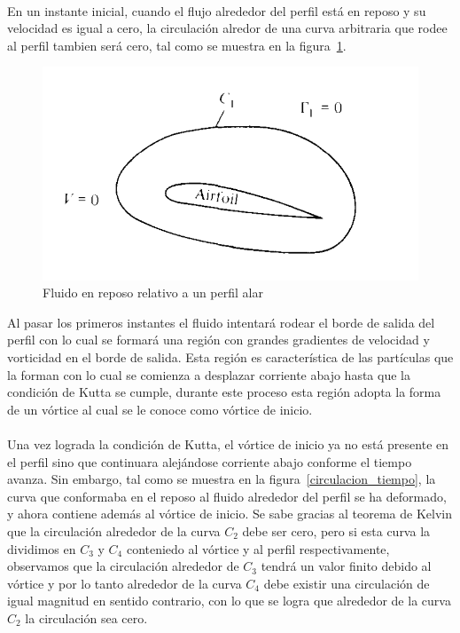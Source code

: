\documentclass[letterpaper, openright, 12pt]{book}
\begin{document}
    \paragraph*{}
        En un instante inicial, cuando el flujo alrededor del perfil está en
        reposo y su velocidad es igual a cero, la circulación alredor de una
        curva arbitraria que rodee al perfil tambien será cero, tal como se
        muestra en la figura~\ref{circulacion_reposo}.

        \begin{figure}[htbp!]
            \centering
            \includegraphics[keepaspectratio, width=115mm]{./Imagenes/circulacion_reposo}
            \caption[Fluido en reposo relativo a un perfil alar]{Fluido en
                reposo relativo a un perfil alar\cite{anderson_fundamentals}}
            \label{circulacion_reposo}
        \end{figure}

        Al pasar los primeros instantes el fluido intentará rodear el borde de
        salida del perfil con lo cual se formará una región con grandes
        gradientes de velocidad y vorticidad en el borde de salida. Esta región
        es característica de las partículas que la forman con lo cual se
        comienza a desplazar corriente abajo hasta que la condición de Kutta se
        cumple, durante este proceso esta región adopta la forma de un vórtice
        al cual se le conoce como vórtice de inicio.

    \paragraph*{}
        Una vez lograda la condición de Kutta, el vórtice de inicio ya no está
        presente en el perfil sino que continuara alejándose corriente abajo
        conforme el tiempo avanza. Sin embargo, tal como se muestra en la
        figura~\ref{circulacion_tiempo}, la curva que conformaba en el reposo al fluido
        alrededor del perfil se ha deformado, y ahora contiene además al
        vórtice de inicio. Se sabe gracias al teorema de Kelvin que la
        circulación alrededor de la curva $C_2$ debe ser cero, pero si esta
        curva la dividimos en $C_3$ y $C_4$ conteniedo al vórtice y al perfil
        respectivamente, observamos que la circulación alrededor de $C_3$ tendrá
        un valor finito debido al vórtice y por lo tanto alrededor de la curva
        $C_4$ debe existir una circulación de igual magnitud en sentido
        contrario, con lo que se logra que alrededor de la curva $C_2$ la
        circulación sea cero.
\end{document}
